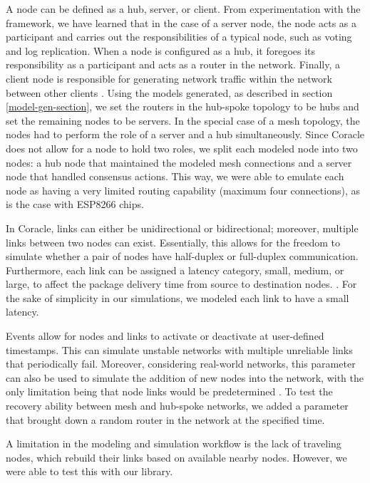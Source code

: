 A node can be defined as a hub, server, or client. From experimentation with the framework, we have learned that in the case of a server node, the node acts as a participant and carries out the responsibilities of a typical node, such as voting and log replication. When a node is configured as a hub, it foregoes its responsibility as a participant and acts as a router in the network. Finally, a client node is responsible for generating network traffic within the network between other clients \cite{howardCoracleEvaluatingConsensus2015}. Using the models generated, as described in section \ref{model-gen-section}, we set the routers in the hub-spoke topology to be hubs and set the remaining nodes to be servers. In the special case of a mesh topology, the nodes had to perform the role of a server and a hub simultaneously. Since Coracle does not allow for a node to hold two roles, we split each modeled node into two nodes: a hub node that maintained the modeled mesh connections and a server node that handled consensus actions. This way, we were able to emulate each node as having a very limited routing capability (maximum four connections), as is the case with ESP8266 chips.

In Coracle, links can either be unidirectional or bidirectional; moreover, multiple links between two nodes can exist. Essentially, this allows for the freedom to simulate whether a pair of nodes have half-duplex or full-duplex communication. Furthermore, each link can be assigned a latency category, small, medium, or large, to affect the package delivery time from source to destination nodes. \cite{howardCoracleEvaluatingConsensus2015}. For the sake of simplicity in our simulations, we modeled each link to have a small latency.

Events allow for nodes and links to activate or deactivate at user-defined timestamps. This can simulate unstable networks with multiple unreliable links that periodically fail. Moreover, considering real-world networks, this parameter can also be used to simulate the addition of new nodes into the network, with the only limitation being that node links would be predetermined \cite{howardCoracleEvaluatingConsensus2015}. To test the recovery ability between mesh and hub-spoke networks, we added a  parameter that brought down a random router in the network at the specified time. 

A limitation in the modeling and simulation workflow is the lack of traveling nodes, which rebuild their links based on available nearby nodes. However, we were able to test this with our library.


